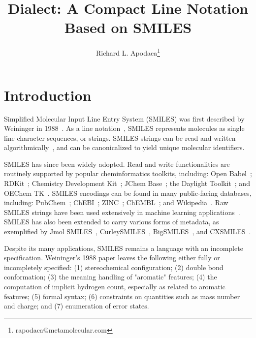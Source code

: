 \documentclass{article}
\begin{document}
\lstset{basicstyle=\ttfamily,breaklines=true}


\title{Dialect: A Compact Line Notation Based on SMILES}
\author{Richard L. Apodaca\thanks{rapodaca@metamolecular.com}}

\maketitle

\section*{Introduction}

Simplified Molecular Input Line Entry System (SMILES) was first described by Weininger in 1988~\cite{weininger:1988}. As a line notation~\cite{wiswesser:1968}, SMILES represents molecules as single line character sequences, or strings. SMILES strings can be read and written algorithmically~\cite{weininger:1989,oBoyle:2012}, and can be canonicalized to yield unique molecular identifiers.

SMILES has since been widely adopted. Read and write functionalities are routinely supported by popular cheminformatics toolkits, including: Open Babel~\cite{oBoyle:2011}; RDKit~\cite{rdkit}; Chemistry Development Kit~\cite{steinbeck:2003}; JChem Base~\cite{jchemBase}; the Daylight Toolkit~\cite{daylightToolkit}; and OEChem TK~\cite{oetk}. SMILES encodings can be found in many public-facing databases, including: PubChem~\cite{kim:2016}; ChEBI~\cite{degtyarenko:2007}; ZINC~\cite{irwin:2005}; ChEMBL~\cite{gaulton:2012}; and Wikipedia~\cite{wikipediaCAS}. Raw SMILES strings have been used extensively in machine learning applications~\cite{sousa:2021}. SMILES has also been extended to carry various forms of metadata, as exemplified by Jmol SMILES~\cite{hanson:2016}, CurleySMILES~\cite{drefahl:2011}, BigSMILES~\cite{lin:2019}, and CXSMILES~\cite{cxsmiles}.

Despite its many applications, SMILES remains a language with an incomplete specification. Weininger's 1988 paper leaves the following either fully or incompletely specified: (1) stereochemical configuration; (2) double bond conformation; (3) the meaning handling of "aromatic" features; (4) the computation of implicit hydrogen count, especially as related to aromatic features; (5) formal syntax; (6) constraints on quantities such as mass number and charge; and (7) enumeration of error states.
\end{document}
